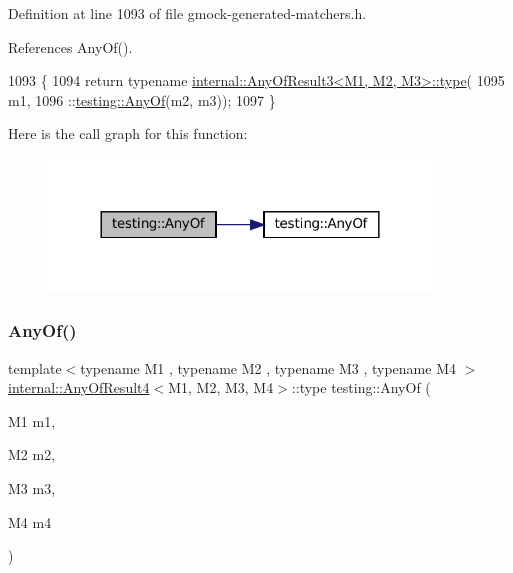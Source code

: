 Definition at line 1093 of file gmock-\/generated-\/matchers.\+h.



References Any\+Of().


\begin{DoxyCode}
1093                            \{
1094   \textcolor{keywordflow}{return} \textcolor{keyword}{typename} \hyperlink{namespacegenerate__debs_a50bc9a7ecac9584553e089a448bcde58}{internal::AnyOfResult3<M1, M2, M3>::type}(
1095       m1,
1096       ::\hyperlink{namespacetesting_a81cfefd9f75cdce827d5bc873cf73aac}{testing::AnyOf}(m2, m3));
1097 \}
\end{DoxyCode}
Here is the call graph for this function\+:
\nopagebreak
\begin{figure}[H]
\begin{center}
\leavevmode
\includegraphics[width=288pt]{namespacetesting_a3ccbde3ba01189587676d44a4333c0a5_cgraph}
\end{center}
\end{figure}
\mbox{\label{namespacetesting_a1cfcacf2cf19543b86445e3585d5356f}} 
\subsubsection{\texorpdfstring{Any\+Of()}{AnyOf()}\hspace{0.1cm}{\footnotesize\ttfamily [3/9]}}
{\footnotesize\ttfamily template$<$typename M1 , typename M2 , typename M3 , typename M4 $>$ \\
\hyperlink{structtesting_1_1internal_1_1AnyOfResult4}{internal\+::\+Any\+Of\+Result4}$<$M1, M2, M3, M4$>$\+::type testing\+::\+Any\+Of (\begin{DoxyParamCaption}\item[{M1}]{m1,  }\item[{M2}]{m2,  }\item[{M3}]{m3,  }\item[{M4}]{m4 }\end{DoxyParamCaption})\hspace{0.3cm}{\ttfamily [inline]}}



